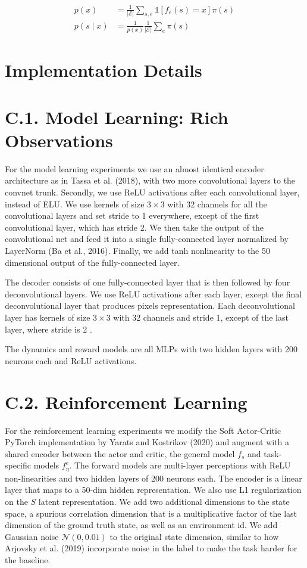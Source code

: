 \documentclass[10pt]{article}
\begin{document}
\[
\begin{aligned}
p(x) & =\frac{1}{|\mathcal{E}|} \sum_{s, e} \mathbb{1}\left[f_{e}(s)=x\right] \pi(s) \\
p(s \mid x) & =\frac{1}{p(x)} \frac{1}{|\mathcal{E}|} \sum_{e} \pi(s)
\end{aligned}
\]

\section{Implementation Details}
\section{C.1. Model Learning: Rich Observations}
For the model learning experiments we use an almost identical encoder architecture as in Tassa et al. (2018), with two more convolutional layers to the convnet trunk. Secondly, we use ReLU activations after each convolutional layer, instead of ELU. We use kernels of size $3 \times 3$ with 32 channels for all the convolutional layers and set stride to 1 everywhere, except of the first convolutional layer, which has stride 2. We then take the output of the convolutional net and feed it into a single fully-connected layer normalized by LayerNorm (Ba et al., 2016). Finally, we add tanh nonlinearity to the 50 dimensional output of the fully-connected layer.

The decoder consists of one fully-connected layer that is then followed by four deconvolutional layers. We use ReLU activations after each layer, except the final deconvolutional layer that produces pixels representation. Each deconvolutional layer has kernels of size $3 \times 3$ with 32 channels and stride 1, except of the last layer, where stride is 2 .

The dynamics and reward models are all MLPs with two hidden layers with 200 neurons each and ReLU activations.

\section{C.2. Reinforcement Learning}
For the reinforcement learning experiments we modify the Soft Actor-Critic PyTorch implementation by Yarats and Kostrikov (2020) and augment with a shared encoder between the actor and critic, the general model $f_{s}$ and task-specific models $f_{\eta}^{e}$. The forward models are multi-layer perceptions with ReLU non-linearities and two hidden layers of 200 neurons each. The encoder is a linear layer that maps to a 50-dim hidden representation. We also use L1 regularization on the $S$ latent representation. We add two additional dimensions to the state space, a spurious correlation dimension that is a multiplicative factor of the last dimension of the ground truth state, as well as an environment id. We add Gaussian noise $\mathcal{N}(0,0.01)$ to the original state dimension, similar to how Arjovsky et al. (2019) incorporate noise in the label to make the task harder for the baseline.
\end{document}
